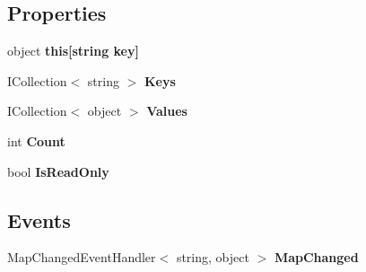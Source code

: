 \subsection*{Properties}
\begin{DoxyCompactItemize}
\item 
\hypertarget{class__1aarsproeve_1_1_common_1_1_observable_dictionary_a56dda0334d80dd16118f7b8e14568e43}{}object {\bfseries this\mbox{[}string key\mbox{]}}\label{class__1aarsproeve_1_1_common_1_1_observable_dictionary_a56dda0334d80dd16118f7b8e14568e43}

\item 
\hypertarget{class__1aarsproeve_1_1_common_1_1_observable_dictionary_a8a6b95aea01ec870543b13c234fddd26}{}I\+Collection$<$ string $>$ {\bfseries Keys}\label{class__1aarsproeve_1_1_common_1_1_observable_dictionary_a8a6b95aea01ec870543b13c234fddd26}

\item 
\hypertarget{class__1aarsproeve_1_1_common_1_1_observable_dictionary_a3f266af47fb6ceaf4b3f3d65e2746229}{}I\+Collection$<$ object $>$ {\bfseries Values}\label{class__1aarsproeve_1_1_common_1_1_observable_dictionary_a3f266af47fb6ceaf4b3f3d65e2746229}

\item 
\hypertarget{class__1aarsproeve_1_1_common_1_1_observable_dictionary_a5973a08feeb436962f7f0bdd571f0d65}{}int {\bfseries Count}\label{class__1aarsproeve_1_1_common_1_1_observable_dictionary_a5973a08feeb436962f7f0bdd571f0d65}

\item 
\hypertarget{class__1aarsproeve_1_1_common_1_1_observable_dictionary_ade8478b862549e27c6862f8428593d6e}{}bool {\bfseries Is\+Read\+Only}\label{class__1aarsproeve_1_1_common_1_1_observable_dictionary_ade8478b862549e27c6862f8428593d6e}

\end{DoxyCompactItemize}
\subsection*{Events}
\begin{DoxyCompactItemize}
\item 
\hypertarget{class__1aarsproeve_1_1_common_1_1_observable_dictionary_a313f6729d91091fa6c74f1bf58d195a1}{}Map\+Changed\+Event\+Handler$<$ string, object $>$ {\bfseries Map\+Changed}\label{class__1aarsproeve_1_1_common_1_1_observable_dictionary_a313f6729d91091fa6c74f1bf58d195a1}

\end{DoxyCompactItemize}


